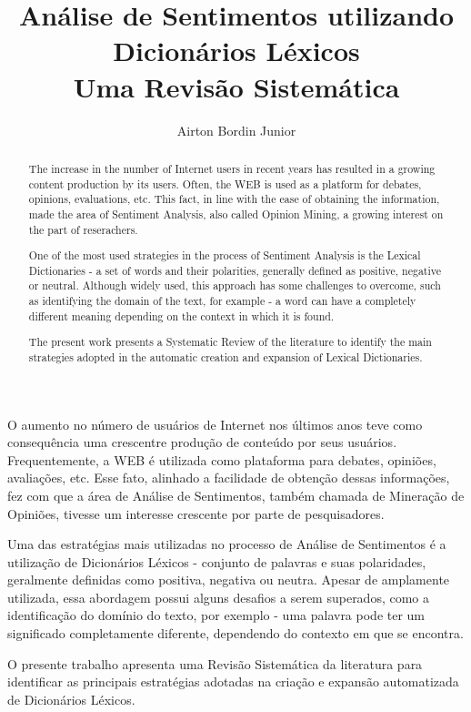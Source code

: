 \documentclass[12pt]{article}
\title{Análise de Sentimentos utilizando Dicionários Léxicos\\ Uma Revisão Sistemática}
\author{Airton Bordin Junior\inst{1}}
\begin{document}
 

\maketitle

\begin{abstract}
The increase in the number of Internet users in recent years has resulted in a growing content production by its users. Often, the WEB is used as a platform for debates, opinions, evaluations, etc. This fact, in line with the ease of obtaining the information, made the area of Sentiment Analysis, also called Opinion Mining, a growing interest on the part of reserachers.

One of the most used strategies in the process of Sentiment Analysis is the Lexical Dictionaries - a set of words and their polarities, generally defined as positive, negative or neutral. Although widely used, this approach has some challenges to overcome, such as identifying the domain of the text, for example - a word can have a completely different meaning depending on the context in which it is found.

The present work presents a Systematic Review of the literature to identify the main strategies adopted in the automatic creation and expansion of Lexical Dictionaries.
\end{abstract}

\begin{resumo} 
O aumento no número de usuários de Internet nos últimos anos teve como consequência uma crescentre produção de conteúdo por seus usuários. Frequentemente, a WEB é utilizada como plataforma para debates, opiniões, avaliações, etc. Esse fato, alinhado a facilidade de obtenção dessas informações, fez com que a área de Análise de Sentimentos, também chamada de Mineração de Opiniões, tivesse um interesse crescente por parte de pesquisadores. 

Uma das estratégias mais utilizadas no processo de Análise de Sentimentos é a utilização de Dicionários Léxicos  - conjunto de palavras e suas polaridades, geralmente definidas como positiva, negativa ou neutra. Apesar de amplamente utilizada, essa abordagem possui alguns desafios a serem superados, como a identificação do domínio do texto, por exemplo - uma palavra pode ter um significado completamente diferente, dependendo do contexto em que se encontra.

O presente trabalho apresenta uma Revisão Sistemática da literatura para identificar as principais estratégias adotadas na criação e expansão automatizada de Dicionários Léxicos.
\end{resumo}
\end{document}
